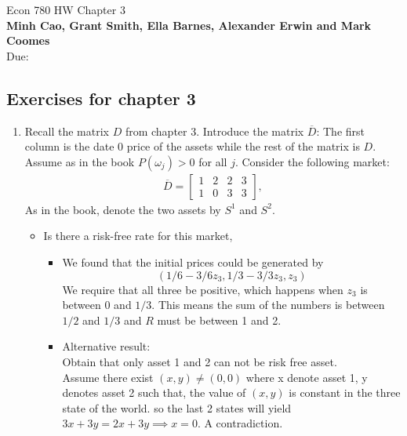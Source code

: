 \documentclass[12pt]{article}
\renewcommand{\o}{\omega}
\newcommand{\ol}{\overline}
\begin{document}
\begin{center}
{\Large Econ 780 \hspace{0.5cm} HW Chapter 3}\\
\textbf{Minh Cao, Grant Smith, Ella Barnes, Alexander Erwin and Mark Coomes}\\ %
Due:  %
\end{center}

\vspace{0.2 cm}


\subsection*{Exercises for chapter 3}


\begin{enumerate}
    \item Recall the matrix $D$ from chapter 3. Introduce the matrix $\ol{D}$: The first column is the date 0 price of the assets while the rest of the matrix is $D$. Assume as in the book $P(\o_j) > 0$ for all $j$. Consider the following market:
    \begin{align*}
    \ol{D}=
    \left[\begin{array}{llll}
    1 & 2 & 2 & 3\\
    1 & 0 & 3 & 3
    \end{array}
    \right],
    \end{align*}
    As in the book, denote the two assets by $S^1$ and $S^2$. 
      \begin{itemize}
        \item Is there a risk-free rate for this market, 
        \begin{itemize}
            \item We found that the initial prices could be generated by $$(1/6-3/6 z_3, 1/3 - 3/3 z_3,z_3)$$
            We require that all three be positive, which happens when $z_3$ is between 0 and $1/3$. This means the sum of the numbers is between $1/2$ and $1/3$ and $R$ must be between 1 and 2. 
            
          \item Alternative result:\\
          Obtain that only asset 1 and 2 can not be risk free asset.\\
           Assume there exist $(x,y) \neq (0,0)$ where x denote asset 1, y denotes asset 2 such that, the value of $(x,y)$ is constant in the three state of the world. so the last 2 states will yield $3x+3y = 2x+3y \implies x = 0$.  A contradiction.
       

\end{itemize}
\end{itemize}
\end{enumerate}
\end{document}
